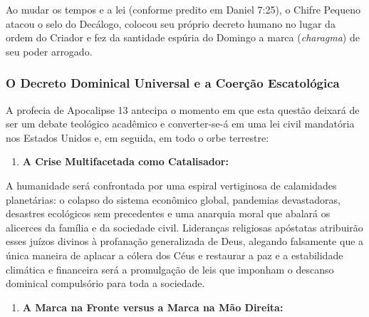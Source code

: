 Ao mudar os tempos e a lei (conforme predito em Daniel 7:25), o Chifre Pequeno atacou o selo do Decálogo, colocou seu próprio decreto humano no lugar da ordem do Criador e fez da santidade espúria do Domingo a marca (\textit{charagma}) de seu poder arrogado.


\subsubsection*{O Decreto Dominical Universal e a Coerção Escatológica}


A profecia de Apocalipse 13 antecipa o momento em que esta questão deixará de ser um debate teológico acadêmico e converter-se-á em uma lei civil mandatória nos Estados Unidos e, em seguida, em todo o orbe terrestre:

\begin{enumerate}
  \item \textbf{A Crise Multifacetada como Catalisador:}
\end{enumerate}

A humanidade será confrontada por uma espiral vertiginosa de calamidades planetárias: o colapso do sistema econômico global, pandemias devastadoras, desastres ecológicos sem precedentes e uma anarquia moral que abalará os alicerces da família e da sociedade civil. Lideranças religiosas apóstatas atribuirão esses juízos divinos à profanação generalizada de Deus, alegando falsamente que a única maneira de aplacar a cólera dos Céus e restaurar a paz e a estabilidade climática e financeira será a promulgação de leis que imponham o descanso dominical compulsório para toda a sociedade.
\begin{enumerate}
  \item \textbf{A Marca na Fronte versus a Marca na Mão Direita:}
\end{enumerate}

